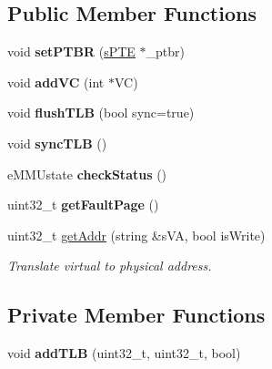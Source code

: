 \subsection*{\-Public \-Member \-Functions}
\begin{DoxyCompactItemize}
\item 
\hypertarget{classcMMU_a07912c15eb7a743c0736f3b4e9616860}{void {\bfseries set\-P\-T\-B\-R} (\hyperlink{structsPTE}{s\-P\-T\-E} $\ast$\-\_\-ptbr)}\label{df/deb/classcMMU_a07912c15eb7a743c0736f3b4e9616860}

\item 
\hypertarget{classcMMU_af6b2683d1514d5587d8a48c2dc025f5e}{void {\bfseries add\-V\-C} (int $\ast$\-V\-C)}\label{df/deb/classcMMU_af6b2683d1514d5587d8a48c2dc025f5e}

\item 
\hypertarget{classcMMU_a551b571684c7203e0993d3270316e75e}{void {\bfseries flush\-T\-L\-B} (bool sync=true)}\label{df/deb/classcMMU_a551b571684c7203e0993d3270316e75e}

\item 
\hypertarget{classcMMU_ab36461a16e1a4a073a025bd91b8ba519}{void {\bfseries sync\-T\-L\-B} ()}\label{df/deb/classcMMU_ab36461a16e1a4a073a025bd91b8ba519}

\item 
\hypertarget{classcMMU_a85181f4d23360667aec58e6822c6889b}{e\-M\-M\-Ustate {\bfseries check\-Status} ()}\label{df/deb/classcMMU_a85181f4d23360667aec58e6822c6889b}

\item 
\hypertarget{classcMMU_a755d689d330c8283f1d6183c1e5cbcc1}{uint32\-\_\-t {\bfseries get\-Fault\-Page} ()}\label{df/deb/classcMMU_a755d689d330c8283f1d6183c1e5cbcc1}

\item 
uint32\-\_\-t \hyperlink{classcMMU_a8f67a55d3444b1164999ef64253eb37e}{get\-Addr} (string \&s\-V\-A, bool is\-Write)
\begin{DoxyCompactList}\small\item\em \-Translate virtual to physical address. \end{DoxyCompactList}\end{DoxyCompactItemize}
\subsection*{\-Private \-Member \-Functions}
\begin{DoxyCompactItemize}
\item 
\hypertarget{classcMMU_a9cc1d030c6180c32aa9e6308a6a7c66c}{void {\bfseries add\-T\-L\-B} (uint32\-\_\-t, uint32\-\_\-t, bool)}\label{df/deb/classcMMU_a9cc1d030c6180c32aa9e6308a6a7c66c}

\end{DoxyCompactItemize}
